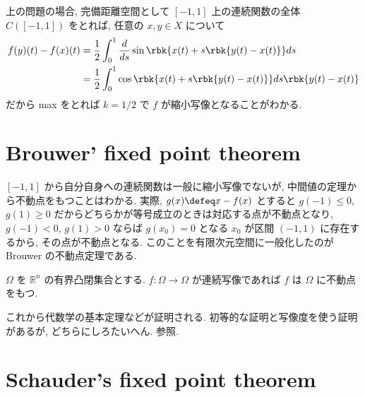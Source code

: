 \documentclass[openany, a4paper, oneside]{jsbook}
\begin{document}
上の問題の場合, 完備距離空間として $[-1, 1]$ 上の連続関数の全体
$C ([-1, 1])$ をとれば, 任意の $x, y \in X$ について
\begin{align}
 f(y) (t) - f(x) (t)
 &=
 \frac{1}{2} \int_0^1 \frac{d}{ds} \sin \rbk{x (t) + s \rbk{y (t) - x (t)}} ds \\
 &=
 \frac{1}{2} \int_0^1 \cos \rbk{x (t) + s \rbk{y (t) - x (t)}} ds \rbk{y (t) - x (t)}
\end{align}
だから max をとれば $k = 1/2$ で $f$ が縮小写像となることがわかる.
\section{Brouwer' fixed point theorem}

$[-1, 1]$ から自分自身への連続関数は一般に縮小写像でないが, 中間値の定理から不動点をもつことはわかる.
実際, $g (x) \defeq x - f (x)$ とすると $g (-1) \le 0$,
$g (1) \ge 0$ だからどちらかが等号成立のときは対応する点が不動点となり,
$g (-1) < 0$,  $g (1) > 0$ ならば $g (x_0) = 0$ となる $x_0$ が区間 $(-1, 1)$ に存在するから, その点が不動点となる.
このことを有限次元空間に一般化したのが Brouwer の不動点定理である.
\begin{thm}
 $\Omega$ を $\mathbb{R}^n$ の有界凸閉集合とする.
 $f \colon \Omega \to \Omega$ が連続写像であれば $f$ は $\Omega$ に不動点をもつ.
\end{thm}
これから代数学の基本定理などが証明される.
初等的な証明と写像度を使う証明があるが, どちらにしろたいへん.
\cite{HisayaMasuda2} 参照.
\section{Schauder's fixed point theorem}
\end{document}

